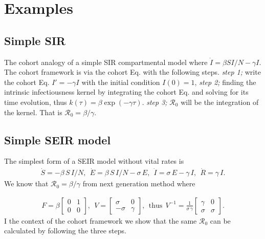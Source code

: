 \documentclass[12pt]{article}
\newcommand{\R}{\ensuremath{\mathcal{R}_0}}
\theoremstyle{definition} %
\begin{document}
\section{Examples}

\subsection {Simple SIR}
The cohort analogy of a simple SIR compartmental model where $\dot I=\beta S I/N-\gamma I$. The cohort framework is via the cohort Eq. with the following steps.
{\it step 1;} write the cohort Eq. $I'=-\gamma I$ with the initial condition $I(0)=1$, 
{\it step 2;} finding the intrinsic infectiousness kernel by integrating the cohort Eq. and solving for its time evolution, thus $k(\tau)=\beta \exp(-\gamma \tau)$.
{\it step 3;} $\R$ will be the integration of the kernel. That is $\R=\beta/\gamma$. 

\subsection{Simple SEIR model}
The simplest form of a SEIR model without vital rates is 
\begin{align}\label{mo:sier1}
\dot S=-\beta\,S\,I/N,~~
\dot E= \beta\,S\,I/N -\sigma\,E,~~
\dot I= \sigma\,E -\gamma\,I,~~
\dot R= \gamma\,I.
\end{align}
We know that $\R=\beta/\gamma$ from next generation method where 

\begin{align}
\label{seir1FV}
F = \beta \left[ \begin {array}{cc} 
0 & 1 \\
0 & 0
 \end {array} \right],~~
V=
 \left[ \begin {array}{cc}
 \sigma & 0 \\
-\sigma & \gamma
\end {array} \right],
~~ \text{thus}~~
V^{-1} = \frac{1}{\sigma\,\gamma}
\left[ \begin {array}{cc}
\gamma & 0 \\
\sigma & \sigma
\end {array} \right].
\end{align}
I the context of the cohort framework we show that the same $\R$ can be calculated by following the three steps.
\end{document}
